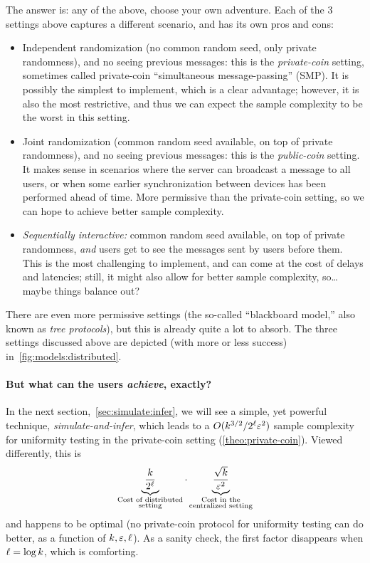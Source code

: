 The answer is: any of the above, choose your own adventure. Each of the 3 settings above captures a different scenario, and has its own pros and cons:
\begin{itemize}
	\item Independent randomization (no common random seed, only private randomness), and no seeing previous messages: this is the \emph{private-coin} setting, sometimes called private-coin ``simultaneous message-passing'' (SMP). It is possibly the simplest to implement, which is a clear advantage; however, it is also the most restrictive, and thus we can expect the sample complexity to be the worst in this setting.
	\item Joint randomization (common random seed available, on top of private randomness), and no seeing previous messages: this is the \emph{public-coin} setting. It makes sense in scenarios where the server can broadcast a message to all users, or when some earlier synchronization between devices has been performed ahead of time. More permissive than the private-coin setting, so we can hope to achieve better sample complexity.
	\item \emph{Sequentially interactive:} common random seed available, on top of private randomness, \emph{and} users get to see the messages sent by users before them. This is the most challenging to implement, and can come at the cost of delays and latencies; still, it might also allow for better sample complexity, so\dots{} maybe things balance out?
\end{itemize}
There are even more permissive settings (\eg the so-called ``blackboard model,'' also known as \emph{tree protocols}), but this is already quite a lot to absorb. The three settings discussed above are depicted (with more or less success) in~\cref{fig:models:distributed}.

\paragraph{But what can the users \emph{achieve}, exactly?} In the next section,~\cref{sec:simulate:infer}, we will see a simple, yet powerful technique, \emph{simulate-and-infer}, which leads to a $O(k^{3/2}/2^\ell\varepsilon^2)$ sample complexity for uniformity testing in the private-coin setting (\cref{theo:private-coin}). Viewed differently, this is 
\begin{equation}
	\label{eq:private:coin}
		\underbrace{\frac{k}{2^\ell}}_{\substack{\text{Cost of distributed}\\\text{setting}}}\cdot \underbrace{\frac{\sqrt{k}}{\varepsilon^2}}_{\substack{\text{Cost in the}\\\text{centralized setting}}}
\end{equation}
and happens to be optimal (no private-coin protocol for uniformity testing can do better, as a function of $k,\varepsilon,\ell$). As a sanity check, the first factor disappears when $\ell = \log k$, which is comforting.\smallskip

